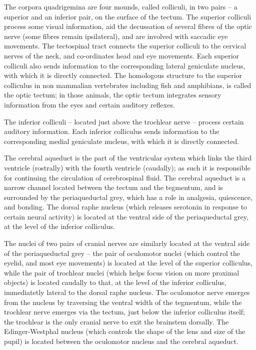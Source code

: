 \documentclass[]{book}
\begin{document}
The corpora quadrigemina are four mounds, called colliculi, in two pairs -- a superior and an inferior pair, on the surface of the tectum. The superior colliculi process some visual information, aid the decussation of several fibres of the optic nerve (some fibres remain ipsilateral), and are involved with saccadic eye movements. The tectospinal tract connects the superior colliculi to the cervical nerves of the neck, and co-ordinates head and eye movements. Each superior colliculi also sends information to the corresponding lateral geniculate nucleus, with which it is directly connected. The homologous structure to the superior colliculus in non mammalian vertebrates including fish and amphibians, is called the optic tectum; in those animals, the optic tectum integrates sensory information from the eyes and certain auditory reflexes.

The inferior colliculi -- located just above the trochlear nerve -- process certain auditory information. Each inferior colliculus sends information to the corresponding medial geniculate nucleus, with which it is directly connected.

The cerebral aqueduct is the part of the ventricular system which links the third ventricle (rostrally) with the fourth ventricle (caudally); as such it is responsible for continuing the circulation of cerebrospinal fluid. The cerebral aqueduct is a narrow channel located between the tectum and the tegmentum, and is surrounded by the periaqueductal grey, which has a role in analgesia, quiescence, and bonding. The dorsal raphe nucleus (which releases serotonin in response to certain neural activity) is located at the ventral side of the periaqueductal grey, at the level of the inferior colliculus.

The nuclei of two pairs of cranial nerves are similarly located at the ventral side of the periaqueductal grey -- the pair of oculomotor nuclei (which control the eyelid, and most eye movements) is located at the level of the superior colliculus, while the pair of trochlear nuclei (which helps focus vision on more proximal objects) is located caudally to that, at the level of the inferior colliculus, immediatetly lateral to the dorsal raphe nucleus. The oculomotor nerve emerges from the nucleus by traversing the ventral width of the tegmentum, while the trochlear nerve emerges via the tectum, just below the inferior colliculus itself; the trochlear is the only cranial nerve to exit the brainstem dorsally. The Edinger-Westphal nucleus (which controls the shape of the lens and size of the pupil) is located between the oculomotor nucleus and the cerebral aqueduct.
\end{document}
